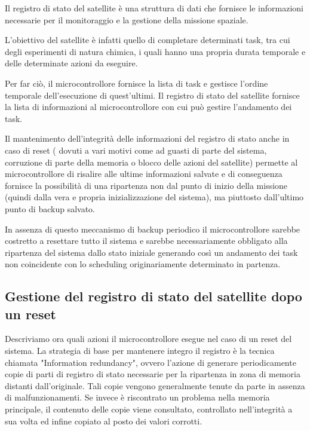 \documentclass[LaM,binding=0.6cm]{../sapthesis}
\begin{document}
Il registro di stato del satellite è una struttura di dati che fornisce le informazioni necessarie per il monitoraggio e la gestione della missione spaziale. 

L’obiettivo del satellite è infatti quello di completare determinati task, tra cui degli esperimenti di natura chimica, i quali hanno una propria durata temporale e delle determinate azioni da eseguire. 

Per far ciò, il microcontrollore fornisce la lista di task e gestisce l’ordine temporale dell’esecuzione di quest’ultimi.
Il registro di stato del satellite fornisce la lista di informazioni al microcontrollore con cui può gestire l’andamento dei task.

Il mantenimento dell’integrità delle informazioni del registro di stato anche in caso di reset ( dovuti a vari motivi come ad guasti di parte del sistema, corruzione di parte della memoria o blocco delle azioni del satellite) permette al microcontrollore di risalire alle ultime informazioni salvate e di conseguenza fornisce la possibilità di una ripartenza non dal punto di inizio della missione (quindi dalla vera e propria inizializzazione del sistema), ma piuttosto dall'ultimo punto di backup salvato. 

In assenza di questo meccanismo di backup periodico il microcontrollore sarebbe costretto a resettare tutto il sistema e sarebbe necessariamente obbligato alla ripartenza del sistema dallo stato iniziale generando così un andamento dei task non coincidente con lo scheduling originariamente determinato in partenza.



\subsection{Gestione del registro di stato del satellite dopo un reset
}
Descriviamo ora quali azioni il microcontrollore esegue nel caso di un reset del sistema.
La strategia di base per mantenere integro il registro è la tecnica chiamata "Information redundancy", ovvero l’azione di generare periodicamente copie di parti di registro di stato necessarie per la ripartenza in zona di memoria distanti dall’originale. 
\newline
Tali copie vengono generalmente tenute da parte in assenza di malfunzionamenti. Se invece è riscontrato un problema nella memoria principale, il contenuto delle copie viene consultato, controllato nell'integrità a sua volta ed infine copiato al posto dei valori corrotti.
\end{document}
